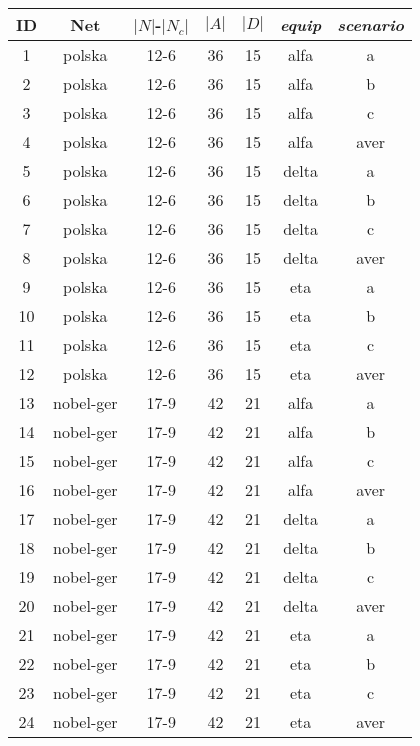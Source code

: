 \documentclass[final,5p,times,twocolumn]{elsarticle}
\begin{document}
\begin{table}[!htc]
\begin{center}
\begin{tabular}{ccccccc}
ID	& Net	     & $|N|$-$|N_c|$	& $|A|$	& $|D|$	& \textit{equip} & \textit{scenario}	\\
\hline
1	& polska	 &  12-6	        &  36	    & 15	& alfa	 & a \\
2	& polska	 &  12-6	        &  36	    & 15	& alfa	 & b \\
3	& polska	 &  12-6	        &  36	    & 15	& alfa	 & c \\
4	& polska	 &  12-6	        &  36	    & 15	& alfa	 & aver \\
5	& polska	 &  12-6	        &  36	    & 15	& delta	 & a \\
6	& polska	 &  12-6	        &  36	    & 15	& delta	 & b \\
7	& polska	 &  12-6	        &  36	    & 15	& delta	 & c \\
8	& polska	 &  12-6	        &  36	    & 15	& delta	 & aver \\
9	& polska	 &  12-6	        &  36	    & 15	& eta	 & a \\
10	& polska	 &  12-6	        &  36	    & 15	& eta	 & b \\
11	& polska	 &  12-6	        &  36	    & 15	& eta	 & c \\
12	& polska	 &  12-6	        &  36	    & 15	& eta    & aver \\
\hline                                                          
13	& nobel-ger  &  17-9	        &  42	    & 21	& alfa	 & a \\
14	& nobel-ger  &  17-9	        &  42	    & 21	& alfa	 & b \\
15	& nobel-ger  &  17-9	        &  42	    & 21	& alfa	 & c \\
16	& nobel-ger  &  17-9	        &  42	    & 21	& alfa	 & aver \\
17  & nobel-ger  &  17-9	        &  42	    & 21	& delta	 & a \\
18	& nobel-ger  &  17-9	        &  42	    & 21	& delta	 & b \\
19	& nobel-ger  &  17-9	        &  42	    & 21	& delta	 & c \\
20	& nobel-ger  &  17-9	        &  42	    & 21	& delta	 & aver \\
21	& nobel-ger  &  17-9	        &  42	    & 21	& eta	 & a \\
22	& nobel-ger  &  17-9	        &  42	    & 21	& eta	 & b \\
23	& nobel-ger  &  17-9	        &  42	    & 21	& eta	 & c \\
24	& nobel-ger  &  17-9	        &  42	    & 21	& eta    & aver \\

\end{tabular}
\end{center}
\end{table}
\end{document}
